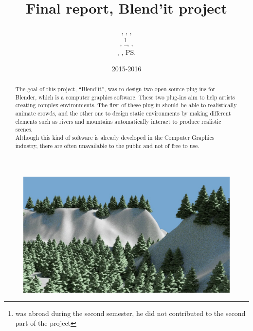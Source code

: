 \documentclass[a4paper,11pt]{article}
\title{Final report, Blend'it project}
\author{\bb, \gc, \dl,\\ \vl, \om\footnote{was abroad during the second semester, he did not contributed to the second part of the project}, \mr,\\ \me, \js, \ps}
\date{2015-2016}
\begin{document}
\maketitle

\begin{figure}[h!]
\centerline{\includegraphics[scale=0.3]{img/demo.png}}
\end{figure}
\begin{abstract}
The goal of this project, ``Blend'it'', was to design two open-source plug-ins for Blender, which is a computer graphics software. These two plug-ins aim to help artists creating complex environments. The first of these plug-in should be able to realistically animate crowds, and the other one to design static environments by making different elements such as rivers and mountains automatically interact to produce realistic scenes. \\
Although this kind of software is already developed in the Computer Graphics industry, there are often unavailable to the public and not of free to use.
\end{abstract}

\newpage
{}

\tableofcontents

\newpage


\newpage


\newpage


\newpage


\newpage




\newpage
\begingroup




\endgroup
\end{document}
